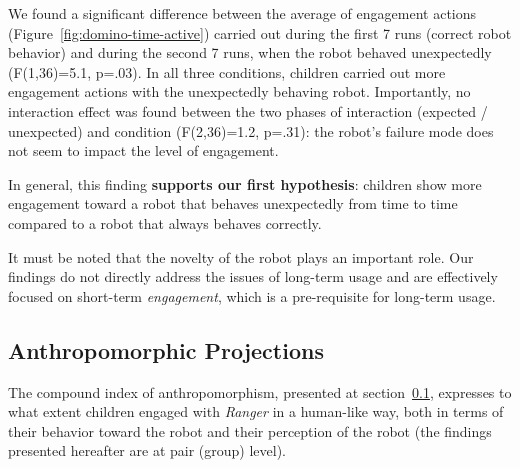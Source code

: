 \documentclass[letterpaper, 10pt, conference]{ieeeconf}
\begin{document}
We found a significant difference between the average of engagement actions
(Figure~\ref{fig:domino-time-active}) carried out during the first 7 runs
(correct robot behavior) and during the second 7 runs, when the robot behaved
unexpectedly (F(1,36)=5.1, p=.03). In all three conditions, children carried out
more engagement actions with the unexpectedly behaving robot.  Importantly, no
interaction effect was found between the two phases of interaction (expected /
unexpected) and condition (F(2,36)=1.2, p=.31): the robot's failure mode does
not seem to impact the level of engagement.

In general, this finding \textbf{supports our first hypothesis}: children show
more engagement toward a robot that behaves unexpectedly from time to time
compared to a robot that always behaves correctly.

It must be noted that the novelty of the robot plays an important role. Our
findings do not directly address the issues of long-term usage and are
effectively focused on short-term \textit{engagement}, which is a pre-requisite
for long-term usage.

\subsection{Anthropomorphic Projections}
\label{antidx}

The compound index of anthropomorphism, presented at section~\ref{antidx},
expresses to what extent children engaged with \emph{Ranger} in a human-like
way, both in terms of their behavior toward the robot and their perception of
the robot (the findings presented hereafter are at pair (group) level).

\end{document}
